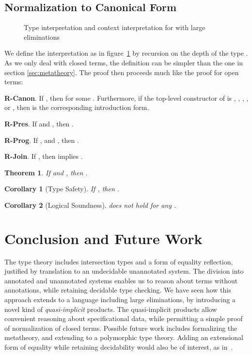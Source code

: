 \documentclass[copyright]{eptcs}
\newtheorem{theorem}{Theorem}
\newtheorem{corollary}{Corollary}
\begin{document}
\subsection{Normalization to Canonical Form}

\begin{figure}

\caption{Type interpretation  and context interpretation  for  with large eliminations}
\label{fig:large_interp}
\end{figure}

We define the interpretation  as in
figure~\ref{fig:large_interp} by recursion on the depth of the
type . As we only deal with closed terms, the definition
can be simpler than the one in section \ref{sec:metatheory}.
The proof then proceeds much like the proof for open
terms:

\noindent \textbf{R-Canon}. If , then  for some . Furthermore, if the top-level constructor of 
is , , , , or , then  is the
corresponding introduction form.

\noindent \textbf{R-Pres}. If  and , then .

\noindent \textbf{R-Prog}. If , and , then .

\noindent \textbf{R-Join}. If , then  
implies .


\begin{theorem}
\label{thm:fundamental_tveclarge}
If  and ,
then .
\end{theorem}

\begin{corollary}[Type Safety]
\label{cor:sn}
If , then .
\end{corollary}

\begin{corollary}[Logical Soundness]
 does not hold for any .
\end{corollary}


\section{Conclusion and Future Work}

The  type theory includes intersection types and a form of
equality reflection, justified by translation to an undecidable
unannotated system.  The division into annotated and unannotated
systems enables us to reason about terms without annotations, while
retaining decidable type checking.  We have seen how this approach
extends to a language including large eliminations, by introducing a
novel kind of \emph{quasi-implicit} products. The quasi-implicit
products allow convenient reasoning about specificational data, while
permitting a simple proof of normalization of closed terms.  Possible
future work includes formalizing the metatheory, and extending to a
polymorphic type theory.  Adding an extensional form of equality while
retaining decidability would also be of interest, as
in~\cite{altenkirch+07}.
\end{document}
